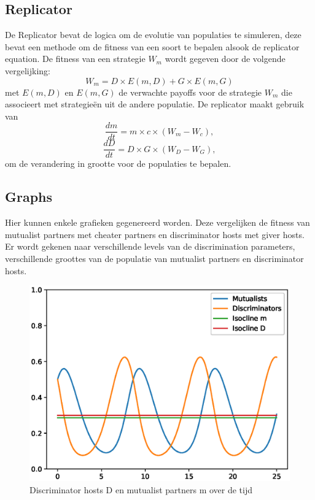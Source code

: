 \documentclass{article}
\begin{document}
\subsection{Replicator}
De Replicator bevat de logica om de evolutie van populaties te simuleren, deze bevat een methode om de fitness van een soort te bepalen alsook de replicator equation.
De fitness van een strategie $W_m$ wordt gegeven door de volgende vergelijking:
\[ W_m = D \times E(m, D) + G \times E(m, G)\]
met $E(m, D)$ en $E(m, G)$ de verwachte payoffs voor de strategie $W_m$ die associeert met strategieën uit de andere populatie.
De replicator maakt gebruik van
\[\frac{dm}{dt} = m \times c \times (W_m - W_c),\]
\[\frac{dD}{dt} = D \times G \times (W_D - W_G),\]
om de verandering in grootte voor de populaties te bepalen.

\subsection{Graphs}
Hier kunnen enkele grafieken gegenereerd worden. Deze vergelijken de fitness van mutualist partners met cheater partners en discriminator hosts met giver hosts. Er wordt gekenen naar verschillende levels van de discrimination parameters, verschillende groottes van de populatie van mutualist partners en discriminator hosts.

\begin{figure}[h!]
	\centering
	\includegraphics[width=\linewidth]{plots/pop_dynamic.eps}
	\caption{Discriminator hosts D en mutualist partners m over de tijd}
	\label{pop)dynamic}
\end{figure}
\end{document}
